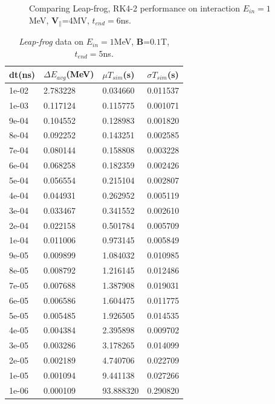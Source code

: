\documentclass[a4paper,oneside,12pt]{report}
\numberwithin{equation}{chapter}
\begin{document}
{\begin{figure}[H]
    \vspace{0pt}
    \caption{\centering Comparing Leap-frog, RK4-2 performance on \eE interaction $E_{in}=1$MeV, $\textbf{V}_{\parallel}$=4MV, $t_{end}=6$ns.} 
    \label{fig:lf_rk2_par_stat_E_comparison}
\end{figure}

\begin{table}[H]
    \centering
    \caption{\textit{Leap-frog} data on $E_{in}=1$MeV, \textbf{B}=$0.1$T, $t_{end}=5$ns.}
    \vspace{10pt}
    \begin{tabular}{|l|l|l|l|}
    \hline
    dt(ns)       & $\Delta E_{avg}$(MeV) & $\mu T_{sim}$(s)    & $\sigma T_{sim}$(s) \\\hline
        1e-02 & 2.783228     & 0.034660  & 0.011537 \\ \hline
        1e-03 & 0.117124     & 0.115775  & 0.001071 \\ \hline
        9e-04 & 0.104552     & 0.128983  & 0.001820 \\  \hline
        8e-04 & 0.092252     & 0.143251  & 0.002585 \\ \hline
        7e-04 & 0.080144     & 0.158808  & 0.003228 \\ \hline
        6e-04 & 0.068258     & 0.182359  & 0.002426 \\\hline
        5e-04 & 0.056554     & 0.215104  & 0.002807 \\\hline
        4e-04 & 0.044931     & 0.262952  & 0.005119 \\\hline
        3e-04 & 0.033467     & 0.341552  & 0.002610 \\\hline
        2e-04 & 0.022158     & 0.501784  & 0.005709 \\\hline
        1e-04 & 0.011006     & 0.973145  & 0.005849 \\\hline
        9e-05 & 0.009899     & 1.084032  & 0.010985 \\\hline
        8e-05 & 0.008792     & 1.216145  & 0.012486 \\\hline
        7e-05 & 0.007688     & 1.387908  & 0.019031 \\\hline
        6e-05 & 0.006586     & 1.604475  & 0.011775 \\\hline
        5e-05 & 0.005485     & 1.926505  & 0.014535 \\\hline
        4e-05 & 0.004384     & 2.395898  & 0.009702 \\\hline
        3e-05 & 0.003286     & 3.178265  & 0.014099 \\\hline
        2e-05 & 0.002189     & 4.740706  & 0.022709 \\\hline
        1e-05 & 0.001094     & 9.441138  & 0.027266 \\\hline
        1e-06 & 0.000109     & 93.888320 & 0.290820 \\ \hline
    \end{tabular}
    \label{tab:lf_mag_table}
\end{table}

}
\end{document}
